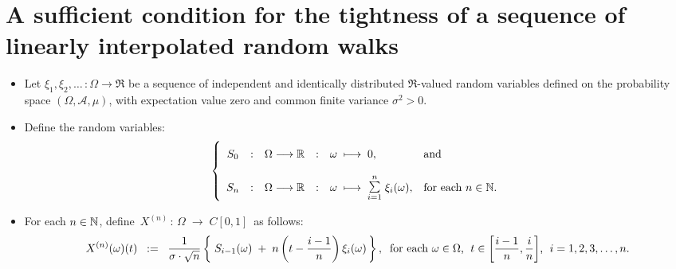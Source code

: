 

\section{A sufficient condition for the tightness of a sequence of linearly interpolated random walks}
\setcounter{theorem}{0}
\setcounter{equation}{0}

\renewcommand{\theenumi}{\roman{enumi}}
\renewcommand{\labelenumi}{\textnormal{(\theenumi)}$\;\;$}

\begin{lemma}
\mbox{}\vskip 0.1cm
\begin{itemize}
\item	Let $\xi_{1}, \xi_{2}, \ldots\, : \Omega \longrightarrow \Re$ be a sequence of
		independent and identically distributed $\Re$-valued random variables
		defined on the probability space $(\Omega,\mathcal{A},\mu)$,
		with expectation value zero and common finite variance $\sigma^{2} > 0$.
\item	Define the random variables:
		\begin{equation*}
		\left\{\begin{array}{ccccll}
		S_{0}
		&:&\overset{{\color{white}1}}{\Omega} \longrightarrow \Re
		&:& \omega \;\longmapsto\; 0,
		& \textnormal{and}
		\\ \\
		S_{n}
		&:&	\Omega \longrightarrow \Re
		&:&	\omega \;\longmapsto\; \overset{n}{\underset{i=1}{\textnormal{\Large$\sum$}}}\;\xi_{i}(\omega),
		& \textnormal{for each $n \in \N$}.
		\end{array}\right.
		\end{equation*}
\item	For each $n \in \mathbb{N}$, define \,$X^{(n)} \,:\, \Omega \;\longrightarrow\;C[0,1]$\, as follows:
		\begin{equation*}
		X^{(n)}(\omega)(t)
		\;\; := \;\;
		\dfrac{1}{\sigma\cdot\sqrt{n}}
		\left\{\;
		S_{i-1}(\omega) \;+\; n\left(t - \dfrac{i-1}{n}\right)\xi_{i}(\omega)
		\,\right\},
		\;\;
		\textnormal{for each $\omega \in \Omega$, \;$t \in \left[\frac{i-1}{n},\frac{i}{n}\right]$, \;$i = 1,2,3,\ldots,n$}.
		\end{equation*}

\end{itemize}
\end{lemma}
